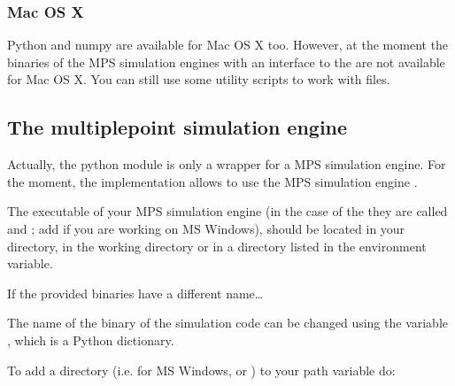 \documentclass[letterpaper,10pt,english]{sphinxmanual}
\begin{document}
\subsubsection{Mac OS X}
\label{\detokenize{installation:mac-os-x}}
Python and numpy are available for Mac OS X too. However, at the
moment the binaries of the MPS simulation engines with an interface to
the  are not available for Mac OS X. You can still use some
utility scripts to work with  files.


\subsection{The multiple\sphinxhyphen{}point simulation engine }
\label{\detokenize{installation:the-multiple-point-simulation-engine-deesse}}
Actually, the python module  is only a wrapper for a MPS
simulation engine. For the moment, the implementation allows to use the
MPS simulation engine .

The executable of your MPS simulation engine (in the case of the
 they are called  and ; add  if
you are working on MS Windows), should be located in your 
directory, in the working directory or in a directory listed in the
 environment variable.

\begin{sphinxShadowBox}

If the provided binaries have a different name…

The name of the binary of the simulation code can be changed
using the variable , which is a Python dictionary.
\end{sphinxShadowBox}

To add a directory (i.e.  for MS Windows, or )
to your path variable do:
\end{document}
